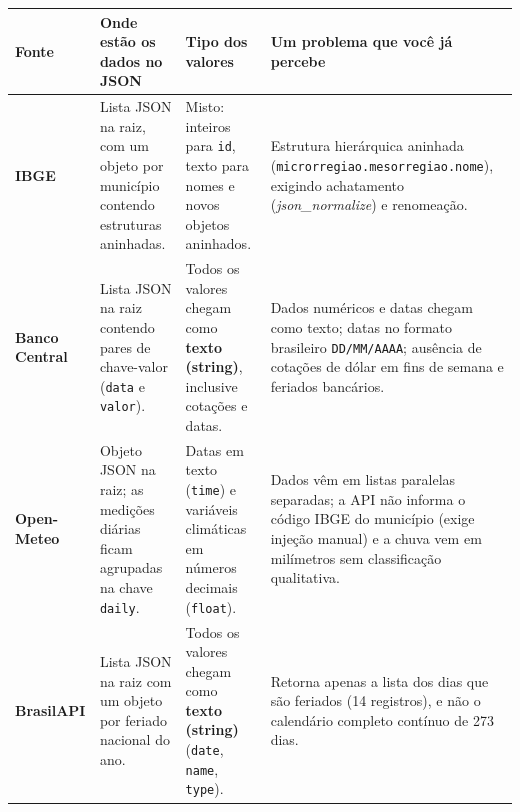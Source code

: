 \documentclass[11pt,a4paper]{article}
\begin{document}
\begin{table}[h!]
\centering
\small
\begin{tabularx}{\textwidth}{p{2.3cm} X X X}
\toprule
\textbf{Fonte} & \textbf{Onde estão os dados no JSON} & \textbf{Tipo dos valores} & \textbf{Um problema que você já percebe} \\
\midrule
\textbf{IBGE} & Lista JSON na raiz, com um objeto por município contendo estruturas aninhadas. & Misto: inteiros para \texttt{id}, texto para nomes e novos objetos aninhados. & Estrutura hierárquica aninhada (\texttt{microrregiao.mesorregiao.nome}), exigindo achatamento (\textit{json\_normalize}) e renomeação. \\
\addlinespace
\textbf{Banco Central} & Lista JSON na raiz contendo pares de chave-valor (\texttt{data} e \texttt{valor}). & Todos os valores chegam como \textbf{texto (string)}, inclusive cotações e datas. & Dados numéricos e datas chegam como texto; datas no formato brasileiro \texttt{DD/MM/AAAA}; ausência de cotações de dólar em fins de semana e feriados bancários. \\
\addlinespace
\textbf{Open-Meteo} & Objeto JSON na raiz; as medições diárias ficam agrupadas na chave \texttt{daily}. & Datas em texto (\texttt{time}) e variáveis climáticas em números decimais (\texttt{float}). & Dados vêm em listas paralelas separadas; a API não informa o código IBGE do município (exige injeção manual) e a chuva vem em milímetros sem classificação qualitativa. \\
\addlinespace
\textbf{BrasilAPI} & Lista JSON na raiz com um objeto por feriado nacional do ano. & Todos os valores chegam como \textbf{texto (string)} (\texttt{date}, \texttt{name}, \texttt{type}). & Retorna apenas a lista dos dias que são feriados (14 registros), e não o calendário completo contínuo de 273 dias. \\
\bottomrule
\end{tabularx}
\end{table}
\end{document}
